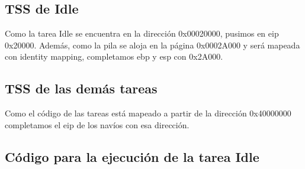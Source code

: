 \subsection*{TSS de Idle}
\par{Como la tarea Idle se encuentra en la dirección 0x00020000, pusimos en eip 0x20000. Además, como la pila se aloja en la página 0x0002A000 y será mapeada con identity mapping, completamos ebp y esp con 0x2A000.}

\subsection*{TSS de las demás tareas}
\par{Como el código de las tareas está mapeado a partir de la dirección 0x40000000 completamos el eip de los navíos con esa dirección.}

\subsection*{Código para la ejecución de la tarea Idle}
\par{}


\clearpage
